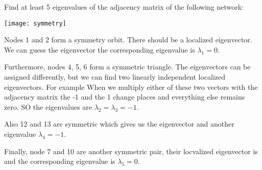 
Find at least 5 eigenvalues of the adjacency matrix of the following network:
\begin{center}
\texttt{[image: symmetry]}
\end{center}

\solution
Nodes 1 and 2 form a symmetry orbit. There should be a localized eigenvector. We can guess the eigenvector
the corresponding eigenvalue is $\lambda_1=0$.

Furthermore, nodes 4, 5, 6 form a symmetric triangle. The eigenvectors can be assigned differently, but we can find two linearly independent localized eigenvectors. For example 
When we multiply either of these two vectors with the adjacency matrix the -1 and the 1 change places and everything else remains zero. SO the eigenvalues are $\lambda_2=\lambda_3=-1$.

Also 12 and 13 are symmetric which gives us the eigenvector 
and another eigenvalue $\lambda_4=-1$. 

Finally, node 7 and 10 are another symmetric pair, their locvalized eigenvector is 
and the corresponding eigenvalue is $\lambda_5=0$.


